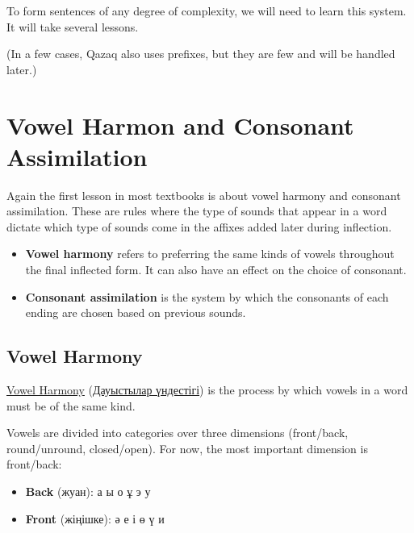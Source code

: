 \documentclass[main.tex]{subfiles}
\begin{document}
To form sentences of any degree of complexity, we will need to learn this system. It will take several lessons.

(In a few cases, Qazaq also uses prefixes, but they are few and will be handled later.)


\section{Vowel Harmon and Consonant Assimilation}
Again the first lesson in most textbooks is about vowel harmony and consonant assimilation. These are rules where the type of sounds that appear in a word dictate which type of sounds come in the affixes added later during inflection.

\begin{itemize}
	\item \textbf{Vowel harmony} refers to preferring the same kinds of vowels throughout the final inflected form. It can also have an effect on the choice of consonant.
	\item \textbf{Consonant assimilation} is the system by which the consonants of each ending are chosen based on previous sounds.
\end{itemize}

\subsection{Vowel Harmony}
\href{https://en.wikipedia.org/wiki/Vowel_harmony#Kazakh}{Vowel Harmony} (\href{https://kk.wikipedia.org/wiki/\%D0\%94\%D0\%B0\%D1\%83\%D1\%8B\%D1\%81\%D1\%82\%D1\%8B\%D0\%BB\%D0\%B0\%D1\%80_\%D2\%AF\%D0\%BD\%D0\%B4\%D0\%B5\%D1\%81\%D1\%82\%D1\%96\%D0\%B3\%D1\%96}{Дауыстылар үндестігі}) is the process by which vowels in a word must be of the same kind.

Vowels are divided into categories over three dimensions (front/back, round/unround, closed/open). For now, the most important dimension is front/back:

\begin{itemize}
	\item \textbf{Back} (жуан): а ы о ұ э у
	\item \textbf{Front} (жіңішке): ә е і ө ү и
\end{itemize}
\end{document}
